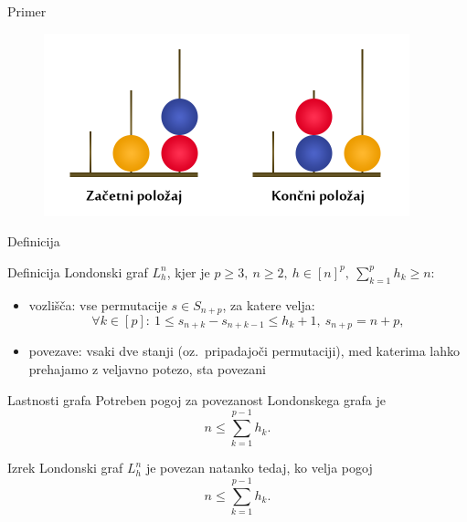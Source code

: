\documentclass{beamer}
\begin{document}
\begin{frame}{Primer}
    \begin{figure}
        \centering
        \includegraphics[height=150pt]{img/london-tower.png}
    \end{figure}
\end{frame}

\begin{frame}{Definicija}
    \begin{block}{Definicija}
        \alert{Londonski graf} $L_h^n$, kjer je $p \geq 3,\ n \geq 2,\ h \in [n]^p,\  \sum_{k=1}^p h_k \geq n$:
        \begin{itemize}
            \item vozlišča: vse permutacije $s \in S_{n+p}$, za katere velja:
            \[\forall k \in [p]:\ 1 \leq s_{n+k} - s_{n+k-1} \leq h_k + 1,\ s_{n+p} = n + p ,\]
            \item povezave: vsaki dve stanji (oz.\ pripadajoči permutaciji), med katerima lahko prehajamo z veljavno potezo, sta povezani
        \end{itemize}
    \end{block}

\end{frame}

\begin{frame}{Lastnosti grafa}
    Potreben pogoj za povezanost Londonskega grafa je 
    \[ n \leq \sum_{k=1}^{p-1} h_k. \]
    \begin{block}{Izrek}
        Londonski graf $L_h^n$ je povezan natanko tedaj, ko velja pogoj
        \[ n \leq \sum_{k=1}^{p-1} h_k. \]
    \end{block}
\end{frame}
\end{document}
